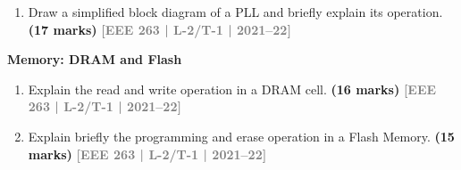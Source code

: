 \documentclass[12pt,a4paper]{article}
\newcommand{\yr}[1]{\hfill\textcolor{gray}{\small\textbf{[#1]}}}
\newcommand{\mk}[1]{\textcolor{orange!70!black}{\small\textbf{(#1 marks)}}}
\newcommand{\subtopic}[2]{%
  \vspace{10pt}
  \noindent\begin{tcolorbox}[colback=#1!8,colframe=#1,boxrule=0.6pt,arc=4pt,
    left=6pt,right=6pt,top=4pt,bottom=4pt]
    \small\bfseries\textcolor{#1}{#2}
  \end{tcolorbox}
  \vspace{2pt}
}
\begin{document}
\begin{enumerate}

\item Draw a simplified block diagram of a PLL and briefly explain its operation.
\mk{17} \yr{EEE 263 | L-2/T-1 | 2021--22}

\end{enumerate}

\subtopic{cH}{Memory: DRAM and Flash}
\label{sub:s10-memory}

\begin{enumerate}

\item Explain the read and write operation in a DRAM cell.
\mk{16} \yr{EEE 263 | L-2/T-1 | 2021--22}

\item Explain briefly the programming and erase operation in a Flash Memory.
\mk{15} \yr{EEE 263 | L-2/T-1 | 2021--22}

\end{enumerate}
\end{document}
